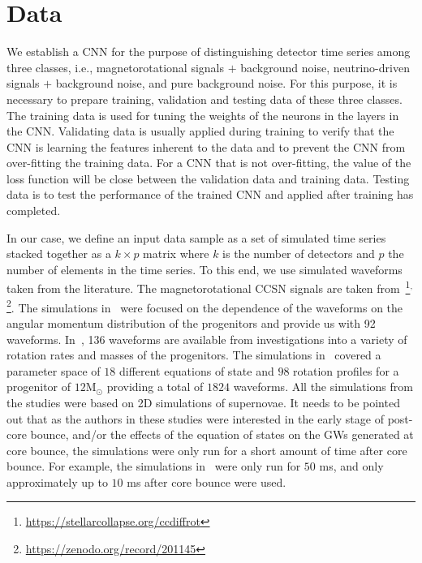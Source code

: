 \documentclass[aps,twocolumn,showpacs,groupedaddress, nofootinbib]{revtex4}  %
\begin{document}
\section{Data}\label{sec:spwf}
%
%
We establish a \ac{CNN} for the purpose of distinguishing detector time series
among three classes, i.e., magnetorotational signals $+$ background noise,
neutrino-driven signals $+$ background noise, and pure background noise. For
this purpose, it is necessary to prepare training, validation and testing data
of these three classes. The training data is used for tuning the weights of
the neurons in the layers in the \ac{CNN}. Validating data is usually applied during training 
to verify that the \ac{CNN} is learning the features inherent to the data and
to prevent the \ac{CNN} from over-fitting the training data.
For a \ac{CNN} that is not over-fitting, the value of the loss function will be close between the validation data and training data.
Testing data is to test the performance of the trained \ac{CNN} and applied after training has completed. 

%
%
In our case, we define an input data sample as a set of simulated time series
stacked together as a $k \times p$ matrix where $k$ is the number of detectors
and $p$ the number of elements in the time series. To this end, we use
simulated waveforms taken from the literature. The magnetorotational \ac{CCSN}
signals are taken from~\cite{abdikamalov2014measuring,
dimmelmeier2008gravitational, richers2017equation}\footnote{\href{https://stellarcollapse.org/ccdiffrot}
{https://stellarcollapse.org/ccdiffrot}}$^{,}$\footnote{\href{https://zenodo.org/record/201145}{https://zenodo.org/record/201145}}. 
The simulations
in~\cite{abdikamalov2014measuring} were focused on the dependence of the
waveforms on the angular momentum distribution of the progenitors and provide
us with 92 waveforms. In~\cite{dimmelmeier2008gravitational}, 136 waveforms are
available from investigations into a variety of rotation rates and masses of
the progenitors. The simulations in~\cite{richers2017equation} covered a
parameter space of $18$ different equations of state and $98$ rotation profiles
for a progenitor of $12\text{M}_\odot$ providing a total of $1824$ waveforms. All
the simulations from the studies were based on 2D simulations of supernovae.
It needs to be pointed out that as the authors in these studies
were interested in the early stage of post-core bounce, and/or the effects of the equation of states on the \acp{GW} generated at core bounce,
the simulations were only run for a short amount of time after core bounce. 
For example, the simulations in~\cite{richers2017equation} were only run for $50$ ms, and only approximately up to $10$ ms after core bounce were used.
\end{document}
